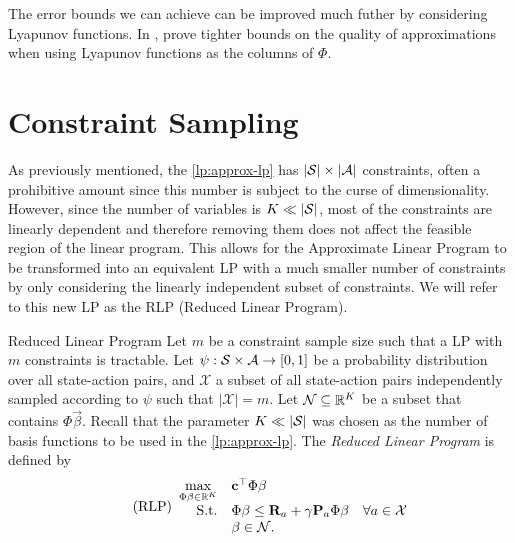 The error bounds we can achieve can be improved much futher by considering
Lyapunov functions. In \cite{farias2003LP2ADP}, \citeauthor{farias2003LP2ADP}
prove tighter bounds on the quality of approximations when using Lyapunov
functions as the columns of $\Phi$.

\section{Constraint Sampling}

As previously mentioned, the \eqref{lp:approx-lp} has $|\mathcal{S}| \times
|\mathcal{A}|$ constraints, often a prohibitive amount since this number is subject
to the curse of dimensionality. However, since the number of variables is $K \ll
|\mathcal{S}|$, most of the constraints are linearly dependent and therefore
removing them does not affect the feasible region of the linear program. This
allows for the Approximate Linear Program to be transformed into an equivalent
LP with a much smaller number of constraints by only considering the linearly
independent subset of constraints. We will refer to this new LP as the RLP
(Reduced Linear Program).

\begin{dfn}{Reduced Linear Program \cite[Sec.~1.3]{farias2004constraint}}{}
    Let $m$ be a constraint sample size such that a LP with $m$ constraints is
    tractable. Let $\psi: \mathcal{S} \times \mathcal{A} \to [0, 1]$ be a probability
    distribution over all state-action pairs, and $\mathcal{X}$ a subset of all
    state-action pairs independently sampled according to $\psi$ such that
    $|\mathcal{X}| = m$. Let $\mathcal{N} \subseteq \mathbb{R}^K$ be a subset that
    contains $\Phi\vec{\beta}$. Recall that the parameter $K \ll |\mathcal{S}|$ was
    chosen as the number of basis functions to be used in the
    \eqref{lp:approx-lp}. The \emph{Reduced Linear Program} is defined by
    \begin{equation}
        \label{lp:reduced-lp}
        \tag{RLP}
        \begin{array}{rl@{}ll}
            \displaystyle \max_{\Phi\vec{\beta} \in \R^{K}} & \vec{c}^{\top} \Phi \vec{\beta} \\
            \text{S.t.} & \displaystyle \Phi \vec{\beta} \leq \vec{R}_a + \gamma \vec{P}_a \Phi \vec{\beta} & \quad \forall a \in \mathcal{X} \\
            & \vec{\beta} \in \mathcal{N}.
        \end{array}
    \end{equation}
\end{dfn}

